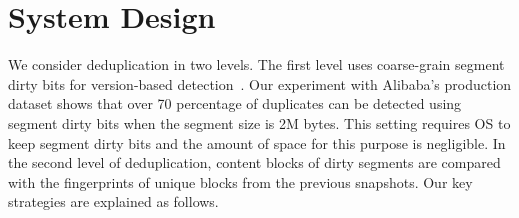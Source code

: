 \section{System Design}
\label{sect:arch}





We consider deduplication in two levels. The first level
uses coarse-grain segment  dirty bits for version-based detection~\cite{Clements2009,Vrable2009}.
Our experiment with Alibaba's production dataset shows that over 70 percentage of 
duplicates can be detected using segment dirty bits when the segment size is 2M bytes.  
This setting requires OS to keep segment dirty bits and the amount of space for this purpose
is negligible. In the second level of deduplication, content blocks of dirty segments 
are compared with the fingerprints of unique  blocks from the previous snapshots.
Our key strategies are explained as follows.
